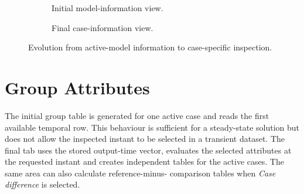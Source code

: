 \begin{figure}[!htbp]
    \centering

    \begin{subfigure}[t]{0.96\textwidth}
        \centering
        \caption{Initial model-information view.}
        \label{fig:appendix_original_model_info}
    \end{subfigure}

    \vspace{0.8em}

    \begin{subfigure}[t]{0.96\textwidth}
        \centering
        \caption{Final case-information view.}
        \label{fig:appendix_final_case_info}
    \end{subfigure}

    \caption{Evolution from active-model information to case-specific
    inspection.}
    \label{fig:appendix_case_information_evolution}
\end{figure}

\FloatBarrier

\section{Group Attributes}
\label{appsec:group_attributes_evolution}

The initial group table is generated for one active case and reads the first
available temporal row. This behaviour is sufficient for a steady-state
solution but does not allow the inspected instant to be selected in a
transient dataset. The final tab uses the stored output-time vector, evaluates
the selected attributes at the requested instant and creates independent
tables for the active cases. The same area can also calculate reference-minus-
comparison tables when \textit{Case difference} is selected.

